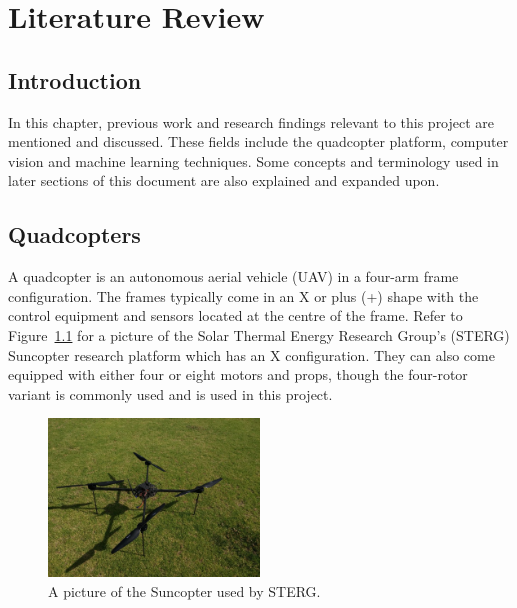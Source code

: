 \chapter{Literature Review}
\label{chap2}

\section{Introduction}

In this chapter, previous work and research findings relevant to this project are mentioned and discussed. These fields include the quadcopter platform, computer vision and machine learning techniques. Some concepts and terminology used in later sections of this document are also explained and expanded upon.

\section{Quadcopters}

A quadcopter is an autonomous aerial vehicle (UAV) in a four-arm frame configuration. The frames typically come in an X or plus (+) shape with the control equipment and sensors located at the centre of the frame. Refer to Figure~\ref{fig:chap2-quad} for a picture of the Solar Thermal Energy Research Group's (STERG) Suncopter research platform which has an X configuration. They can also come equipped with either four or eight motors and props, though the four-rotor variant is commonly used and is used in this project.

\begin{figure}
  \centering
  \includegraphics[clip, trim = 0 0 30 20, width=0.5\textwidth]{figures/chapter2/quadcopter}
  \caption[A picture of the Suncopter used by STERG.]{A picture of the Suncopter used by STERG.}
\label{fig:chap2-quad}
\end{figure}

